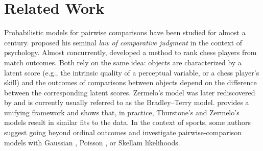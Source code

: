 \section{Related Work}
\label{sec:relwork}

Probabilistic models for pairwise comparisons have been studied for almost a century.
\citet{thurstone1927law} proposed his seminal \emph{law of comparative judgment} in the context of psychology.
Almost concurrently, \citet{zermelo1928berechnung} developed a method to rank chess players from match outcomes.
Both rely on the same idea: objects are characterized by a latent score (e.g., the intrinsic quality of a perceptual variable, or a chess player's skill) and the outcomes of comparisons between objects depend on the difference between the corresponding latent scores.
Zermelo's model was later rediscovered by \citet{bradley1952rank} and is currently usually referred to as the Bradley--Terry model.
\citet{stern1992all} provides a unifying framework and shows that, in practice, Thurstone's and Zermelo's models result in similar fits to the data.
In the context of sports, some authors suggest going beyond ordinal outcomes and investigate pairwise-comparison models with Gaussian \citep{guo2012score}, Poisson \citep{maher1982modelling, guo2012score}, or Skellam \citep{karlis2009bayesian} likelihoods.


